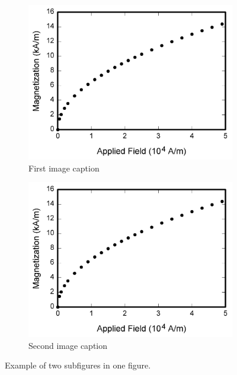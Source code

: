 \begin{figure}[htbp] %
    \centering
    \begin{subfigure}{0.45\columnwidth}
        \includegraphics[width=\linewidth]{Photos/fig1.png}
        \caption{First image caption}
    \end{subfigure}
    \hfill
    \begin{subfigure}{0.45\columnwidth}
        \includegraphics[width=\linewidth]{Photos/fig1.png}
        \caption{Second image caption}
    \end{subfigure}
    \caption{Example of two subfigures in one figure.}
    \label{fig:mainfig}
\end{figure}

